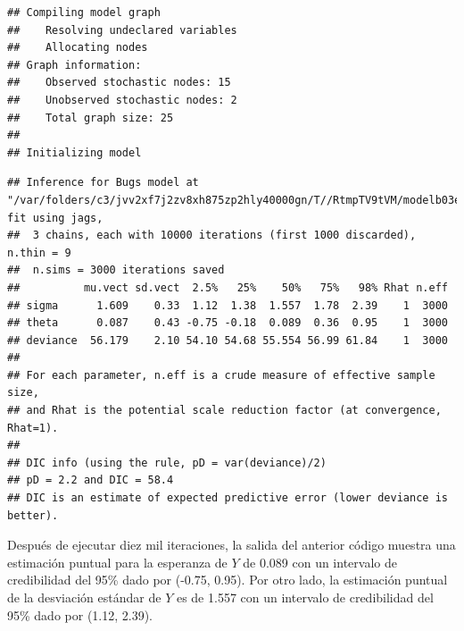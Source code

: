 \begin{Eje}
\begin{knitrout}
\begin{kframe}
\begin{alltt}
 \hlkwb{<-} \hlstd{(}\hlstd{,}\hlstd{)}
 \hlkwb{<-} \hlstd{(}\hlstd{,} \hlstd{)}
 \hlkwb{<-} \hlstd{()\{}
  \hlstd{(}\hlstd{=}\hlstd{(}\hlstd{),} \hlstd{=}\hlstd{(}\hlstd{))}
\hlstd{\}}

 \hlkwb{<-} \hlstd{(}  \hlstd{=}\hlstd{,}
               \hlstd{=}\hlstd{,} 
\end{alltt}


{\ttfamily\noindent\itshape\color{messagecolor}{\#\# module glm loaded}}\begin{verbatim}
## Compiling model graph
##    Resolving undeclared variables
##    Allocating nodes
## Graph information:
##    Observed stochastic nodes: 15
##    Unobserved stochastic nodes: 2
##    Total graph size: 25
## 
## Initializing model
\end{verbatim}
\begin{alltt}
\end{alltt}
\begin{verbatim}
## Inference for Bugs model at "/var/folders/c3/jvv2xf7j2zv8xh875zp2hly40000gn/T//RtmpTV9tVM/modelb03eb7ead65.txt", fit using jags,
##  3 chains, each with 10000 iterations (first 1000 discarded), n.thin = 9
##  n.sims = 3000 iterations saved
##          mu.vect sd.vect  2.5%   25%    50%   75%   98% Rhat n.eff
## sigma      1.609    0.33  1.12  1.38  1.557  1.78  2.39    1  3000
## theta      0.087    0.43 -0.75 -0.18  0.089  0.36  0.95    1  3000
## deviance  56.179    2.10 54.10 54.68 55.554 56.99 61.84    1  3000
## 
## For each parameter, n.eff is a crude measure of effective sample size,
## and Rhat is the potential scale reduction factor (at convergence, Rhat=1).
## 
## DIC info (using the rule, pD = var(deviance)/2)
## pD = 2.2 and DIC = 58.4
## DIC is an estimate of expected predictive error (lower deviance is better).
\end{verbatim}
\end{kframe}
\end{knitrout}

Después de ejecutar diez mil iteraciones, la salida del anterior código muestra una estimación puntual para la esperanza de $Y$ de 0.089 con un intervalo de credibilidad del 95\% dado por (-0.75, 0.95). Por otro lado, la estimación puntual de la desviación estándar de $Y$ es de 1.557 con un intervalo de credibilidad del 95\% dado por (1.12, 2.39).


\end{Eje}
